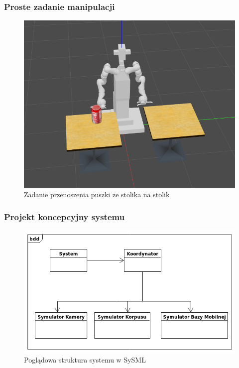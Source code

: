 
\begin{frame}
    \frametitle{Proste zadanie manipulacji}
    \begin{figure}
        \includegraphics[scale=0.35]{./images/velma_stero_task.png}
        \caption{Zadanie przenoszenia puszki ze stolika na stolik}
    \end{figure}
\end{frame}


\begin{frame}
	\frametitle{Projekt koncepcyjny systemu}
	\bigskip
	\begin{figure}
        \includegraphics[scale=0.5]{./images/example_bdd.png}
        \caption{Poglądowa struktura systemu w SySML}
    \end{figure}
\end{frame}

